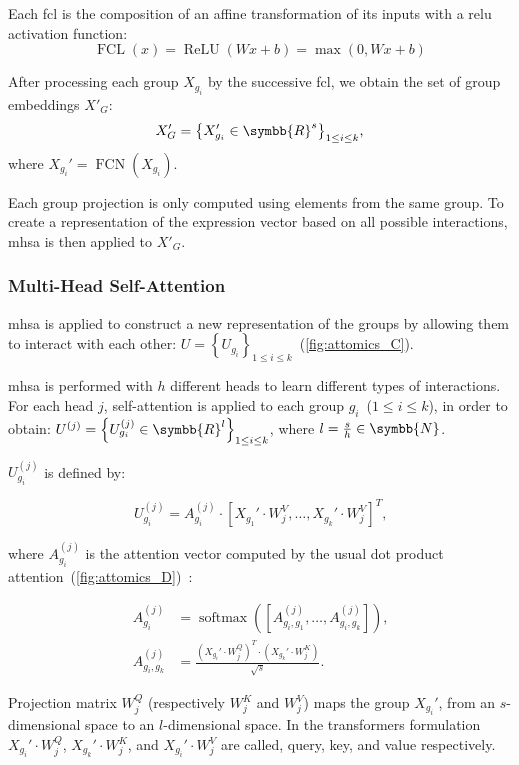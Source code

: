 \documentclass[../main.tex]{subfiles}
\begin{document}
			Each \gls{fcl} is the composition of an affine transformation of its inputs with a \gls{relu} activation function:
			\[ \operatorname{FCL}\left(x\right) = \operatorname{ReLU}\left(Wx+b \right) = \max\left(0, Wx+b\right) \]

			After processing each group \(X_{g_i}\) by the successive \gls{fcl}, we obtain the set of group embeddings \(X'_G\):
			\[ X_G' = {\left\{ X_{g_i}' \in \symbb{R}^{s}\right\}}_{1 \leq i \leq k} \text{,} \]
			where \(X_{g_i}' = \operatorname{FCN}\left(X_{g_i}\right)\).

			Each group projection is only computed using elements from the same group.
			To create a representation of the expression vector based on all possible interactions, \gls{mhsa} is then applied to \(X'_G\).

		\subsubsection{Multi-Head Self-Attention}

			\Gls{mhsa} is applied to construct a new representation of the groups by allowing them to interact with each other: \(U = {\left\{ U_{g_i}\right\}}_{1 \leq i \leq k}\)~(\cref{fig:attomics_C}).

			\Gls{mhsa} is performed with \(h\) different heads to learn different types of interactions.
			For each head \(j\), self-attention is applied to each group \(g_i\)~(\(1 \leq i \leq k \)), in order to obtain: \(U^{(j)} = {\left\{ U^{(j)}_{g_i} \in \symbb{R}^{l} \right\}}_{1 \leq i \leq k}\), where \(l = \frac{s}{h} \in \symbb{N}\).

			\(U^{(j)}_{g_i}\) is defined by:

			\[ U^{(j)}_{g_i} = A^{(j)}_{g_i} \cdot {\left[ X_{g_1}' \cdot W_j^V, \ldots ,  X_{g_k}' \cdot W_j^V\right]}^T \text{,}\]

			where \(A^{(j)}_{g_i}\) is the attention vector computed by the usual dot product attention~(\cref{fig:attomics_D})~\cite{AttentionAllYouNeed}:

			\begin{align*}
				A^{(j)}_{g_i}      & = \operatorname{softmax}\left(\left[A^{(j)}_{g_i,g_1}, \ldots,  A^{(j)}_{g_i,g_k}\right]\right) \text{,}    \\
				A^{(j)}_{g_i, g_k} & =  \frac{{\left(X_{g_i}' \cdot W_j^Q\right)}^T \cdot \left(X_{g_k}' \cdot W_j^K \right)}{\sqrt{s}} \text{.}
			\end{align*}

			Projection matrix \(W^Q_j\) (respectively \(W^K_j\) and \(W^V_j\)) maps the group \(X_{g_i}'\), from an \(s\)-dimensional space to an \(l\)-dimensional space.
			In the transformers formulation \(X_{g_i}' \cdot W_j^Q\), \(X_{g_k}' \cdot W^K_j\), and \(X_{g_i}' \cdot W^V_j\) are called, query, key, and value respectively.
\end{document}
